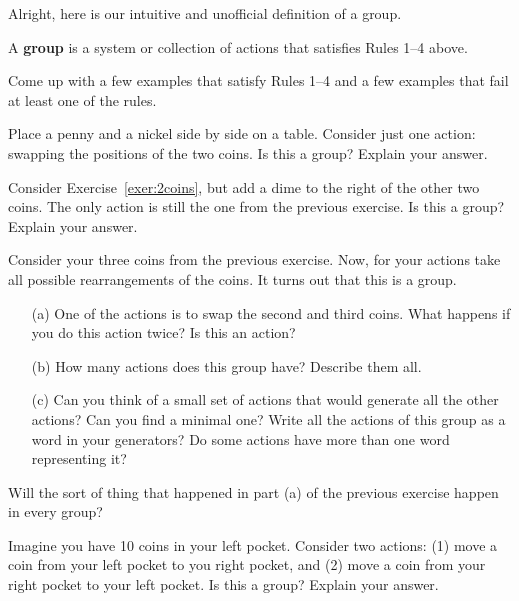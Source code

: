 Alright, here is our intuitive and unofficial definition of a group.

\begin{intuitivedef}\label{def:informal_group}
A \textbf{group} is a system or collection of actions that satisfies Rules 1--4 above.
\end{intuitivedef}

\begin{exercise}
Come up with a few examples that satisfy Rules 1--4 and a few examples that fail at least one of the rules.
\end{exercise}

\begin{exercise}\label{exer:2coins}%
Place a penny and a nickel side by side on a table.  Consider just one action: swapping the positions of the two coins.  Is this a group?  Explain your answer.
\end{exercise}

\begin{exercise}
Consider Exercise~\ref{exer:2coins}, but add a dime to the right of the other two coins.  The only action is still the one from the previous exercise.  Is this a group?   Explain your answer.
\end{exercise}

\begin{exercise}
Consider your three coins from the previous exercise.  Now, for your actions take all possible rearrangements of the coins.  It turns out that this is a group.
\begin{enumerate}
\item[(a)] One of the actions is to swap the second and third coins.  What happens if you do this action twice?  Is this an action?  
\item[(b)] How many actions does this group have?  Describe them all.
\item[(c)] Can you think of a small set of actions that would generate all the other actions?  Can you find a minimal one?  Write all the actions of this group as a word in your generators?  Do some actions have more than one word representing it?
\end{enumerate}
\end{exercise}

\begin{exercise}
Will the sort of thing that happened in part (a) of the previous exercise happen in every group?
\end{exercise}

\begin{exercise}%
Imagine you have 10 coins in your left pocket.  Consider two actions: (1) move a coin from your left pocket to you right pocket, and (2) move a coin from your right pocket to your left pocket.  Is this a group?  Explain your answer.
\end{exercise}

